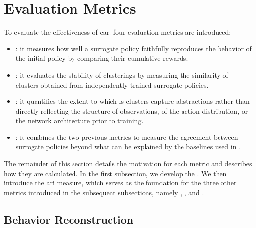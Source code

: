 \section{Evaluation Metrics}
\label{sec:clustering_agent_representation_metrics}

To evaluate the effectiveness of \gls{car}, four evaluation metrics are introduced:

\begin{itemize}
    \item \textbf{\BehaviorReconstructionName} : it measures how well a surrogate policy faithfully reproduces the behavior of the initial policy by comparing their cumulative rewards.
    \item \textbf{\ClusteringUniversalityName} : it evaluates the stability of clusterings by measuring the similarity of clusters obtained from independently trained surrogate policies.
    \item \textbf{\AbstractionScoreName} : it quantifies the extent to which \gls{ls} clusters capture abstractions rather than directly reflecting the structure of observations, of the action distribution, or the network architecture prior to training.
    \item \textbf{\AdjustedClusteringUniversalityName}: it combines the two previous metrics to measure the agreement between surrogate policies beyond what can be explained by the baselines used in \AbstractionScoreName.
\end{itemize}

The remainder of this section details the motivation for each metric and describes how they are calculated.
In the first subsection, we develop the \BehaviorReconstructionName{}.
We then introduce the \gls{ari} measure, which serves as the foundation for the three other metrics introduced in the subsequent subsections, namely \ClusteringUniversalityName{}, \AbstractionScoreName{}, and \AdjustedClusteringUniversalityName{}.

\subsection{Behavior Reconstruction}


